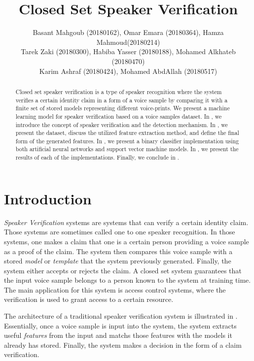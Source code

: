 \documentclass[twocolumn]{article}
\title{Closed Set Speaker Verification}
\author{
  Basant Mahgoub (20180162), Omar Emara (20180364), Hamza Mahmoud(20180214) \\
  Tarek Zaki (20180300), Habiba Yasser (20180188), Mohamed Alkhateb (20180470) \\
  Karim Ashraf (20180424), Mohamed AbdAllah (20180517)
}
\begin{document}
\maketitle

\begin{abstract}

  Closed set speaker verification is a type of speaker recognition where the
  system verifies a certain identity claim in a form of a voice sample by
  comparing it with a finite set of stored models representing different
  voice-prints. We present a machine learning model for speaker verification
  based on a voice samples dataset. In , we introduce the
  concept of speaker verification and the detection mechanism. In
  , we present the dataset, discuss the utilized feature
  extraction method, and define the final form of the generated features. In
  , we present a binary classifier implementation using
  both artificial neural networks and support vector machine models. In
  , we present the results of each of the implementations.
  Finally, we conclude in .

\end{abstract}

\section{Introduction}
\label{sec:Introduction}

\emph{Speaker Verification} systems are systems that can verify a certain
identity claim. Those systems are sometimes called one to one speaker
recognition. In those systems, one makes a claim that one is a certain person
providing a voice sample as a proof of the claim. The system then compares this
voice sample with a stored \emph{model} or \emph{template} that the system
previously generated. Finally, the system either accepts or rejects the claim. A
closed set system guarantees that the input voice sample belongs to a person
known to the system at training time. The main application for this system is
access control systems, where the verification is used to grant access to a
certain resource.

The architecture of a traditional speaker verification system is illustrated in
. Essentially, once a voice sample is input into
the system, the system extracts useful \emph{features} from the input and
matchs those features with the models it already has stored. Finally, the
system makes a decision in the form of a claim verification.
\end{document}
